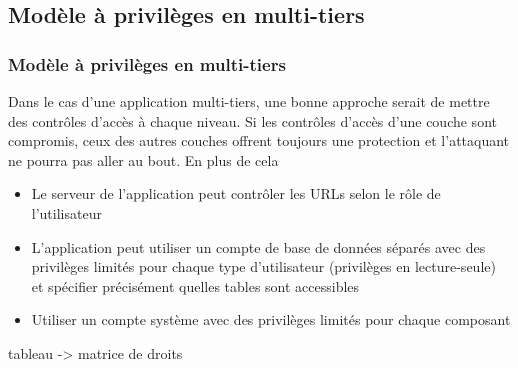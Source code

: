 \documentclass{beamer}
\begin{document}
\subsection{Modèle à privilèges en multi-tiers}
\begin{frame}
  \frametitle{Modèle à privilèges en multi-tiers}
  Dans le cas d'une application multi-tiers, une bonne approche serait de mettre des contrôles d'accès à chaque niveau. Si les contrôles d'accès d'une couche sont compromis, ceux des autres couches offrent toujours une protection et l'attaquant ne pourra pas aller au bout. En plus de cela 
  \begin{itemize}
    \item Le serveur de l'application peut contrôler les URLs selon le rôle de l'utilisateur
    \item L'application peut utiliser un compte de base de données séparés avec des privilèges limités pour chaque type d'utilisateur (privilèges en lecture-seule) et spécifier précisément quelles tables sont accessibles
    \item Utiliser un compte système avec des privilèges limités pour chaque composant
  \end{itemize}
\end{frame}

\begin{frame}
  tableau -> matrice de droits
\end{frame}
\end{document}
